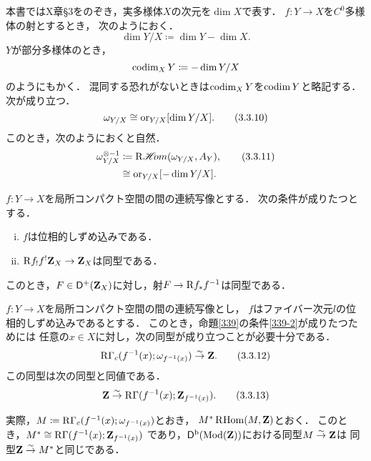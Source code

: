 \begin{leftbar}
\begin{NTN}[{\cite[Notation 3.3.8]{KS90}}]
    本書ではX章\S3をのぞき，実多様体\(X\)の次元を\(\dim X\)で表す．
    \(f\colon Y\to X\)を\(C^0\)多様体の射とするとき，
    次のようにおく．
    \begin{equation}
        \dim{Y/X}\coloneqq \dim Y-\dim{X}.\tag{3.3.9}
    \end{equation}
    \(Y\)が部分多様体のとき，
    \[
        \mathop{\mathrm{codim}}\nolimits_{X}Y\coloneqq-\dim{Y/X}
    \]
    のようにもかく．
    混同する恐れがないときは\(\mathop{\mathrm{codim}}\nolimits_X Y\)を\(\mathop{\mathrm{codim}}\nolimits Y\)と略記する．
    次が成り立つ．
    \begin{equation}
        \omega_{Y/X}\cong
        \mathord{\mathrm{or}}_{Y/X}[\dim{Y/X}].\tag{3.3.10}
    \end{equation}
    このとき，次のようにおくと自然．
    \begin{align}
            \omega_{Y/X}^{\otimes{-1}}&\coloneqq
            \mathop{\mathrm{R}\hspace{-1.5pt}\mathop{\mathscr{H}\hspace{-2pt}om}\nolimits}\nolimits(\omega_{Y/X},A_Y),\tag{3.3.11}\\
            &\cong\mathord{\mathrm{or}}_{Y/X}[-\dim{Y/X}].\notag
    \end{align}
\end{NTN}
\end{leftbar}
\begin{leftbar}
\begin{PRP}[{\cite[Proposition 3.3.9]{KS90}}]\label{339}
    \(f\colon Y\to X\)を局所コンパクト空間の間の連続写像とする．
    次の条件が成りたつとする．
    \begin{enumerate}[(i)]
        \item \(f\)は位相的しずめ込みである．
        \item \(\mathrm{R} f_!f^!\mathbf{Z}_X\to\mathbf{Z}_X\)は同型である．\label{339-2}
    \end{enumerate}
    このとき，\(F\in\mathop{\mathsf{D}^\mathrm{+}}\nolimits(\mathbf{Z}_X)\)に対し，射\(F\to \mathrm{R} f_\ast f^{-1}\)は同型である．
\end{PRP}
\end{leftbar}


\begin{RMK}
    \(f\colon Y\to X\)を局所コンパクト空間の間の連続写像とし，
    \(f\)はファイバー次元\(l\)の位相的しずめ込みであるとする．
    このとき，命題\ref{339}の条件\eqref{339-2}が成りたつためには
    任意の\(x\in X\)に対し，次の同型が成り立つことが必要十分である．
    \begin{equation}
        \mathop{\mathrm{R}\hspace{-0pt}\Gamma}\nolimits_c(f^{-1}(x);\omega_{f^{-1}(x)})\mathrel{\overset{\sim}{\rightarrow}}\mathbf{Z}.\tag{3.3.12}
    \end{equation}
    この同型は次の同型と同値である．
    \begin{equation}
        \mathbf{Z}\mathrel{\overset{\sim}{\rightarrow}}
        \mathop{\mathrm{R}\hspace{-0pt}\Gamma}\nolimits(f^{-1}(x);\mathbf{Z}_{f^{-1}(x)}).\tag{3.3.13}
    \end{equation}
\end{RMK}
実際，\(M\coloneqq\mathop{\mathrm{R}\hspace{-0pt}\Gamma}\nolimits_c(f^{-1}(x);\omega_{f^{-1}(x)})\)とおき，
\(M^\ast\mathop{\mathrm{R}\hspace{-1.5pt}\mathop{\mathrm{Hom}}\nolimits}\nolimits(M,\mathbf{Z})\)とおく．
このとき，\(M^\ast\cong \mathop{\mathrm{R}\hspace{-0pt}\Gamma}\nolimits(f^{-1}(x);\mathbf{Z}_{f^{-1}(x)})\)
であり，\(\mathop{\mathsf{D}^\mathrm{b}}\nolimits(\mathop{\mathrm{Mod}}\nolimits(\mathbf{Z}))\)における同型\(M\mathrel{\overset{\sim}{\rightarrow}}\mathbf{Z}\)は
同型\(\mathbf{Z}\mathrel{\overset{\sim}{\rightarrow}} M^\ast\)と同じである．

